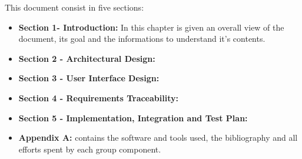 This document consist in five sections:
\begin{itemize}
	\item \textbf{Section 1- Introduction:} In this chapter is given an overall view of the document, its goal and the informations to understand it's contents.
	\item \textbf{Section 2 - Architectural Design:} 
	\item \textbf{Section 3 - User Interface Design:} 
	\item \textbf{Section 4 - Requirements Traceability:}
	\item \textbf{Section 5 - Implementation, Integration and Test Plan:}
	\item \textbf{Appendix A:} contains the software and tools used, the bibliography and all efforts spent by each group component. 
\end{itemize}